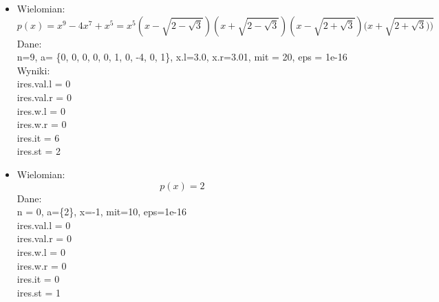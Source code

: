 \documentclass[a4paper]{article}
\begin{document}
\begin{itemize}
\item Wielomian:
$$ p(x) = x^9 - 4x^7 + x^5 = x^5(x-\sqrt{2-\sqrt{3}})(x+\sqrt{2-\sqrt{3}})(x-\sqrt{2+\sqrt{3}})(x+\sqrt{2+\sqrt{3}))} $$
Dane: \\
n=9, a= \{0, 0, 0, 0, 0, 1, 0, -4, 0, 1\}, x.l=3.0, x.r=3.01, mit = 20, eps = 1e-16 \\
Wyniki: \\
ires.val.l = 0 \\
ires.val.r = 0 \\
ires.w.l = 0 \\
ires.w.r = 0 \\
ires.it = 6 \\
ires.st = 2 \\

\item Wielomian:
$$ p(x) = 2 $$
Dane: \\
n = 0, a=\{2\}, x=-1, mit=10, eps=1e-16 \\
ires.val.l = 0 \\
ires.val.r = 0 \\
ires.w.l = 0 \\
ires.w.r = 0 \\
ires.it = 0 \\
ires.st = 1 \\
\end{itemize}
\end{document}
